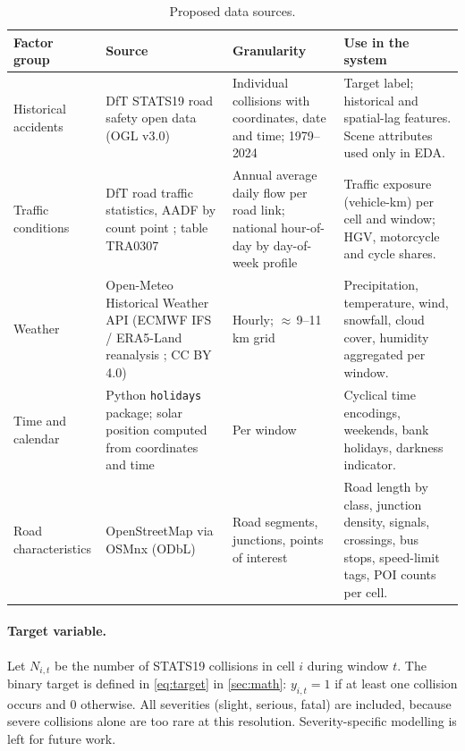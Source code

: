 \begin{table}[t]
\centering
\caption{Proposed data sources.}
\label{tab:datasources}
\footnotesize
\begin{tabularx}{\textwidth}{L{2.4cm} L{3.4cm} L{3.1cm} Y}
\toprule
\textbf{Factor group} & \textbf{Source} & \textbf{Granularity} & \textbf{Use in the system} \\
\midrule
Historical accidents & DfT STATS19 road safety open data \cite{dft2025roadsafetydata} (OGL v3.0) & Individual collisions with coordinates, date and time; 1979--2024 & Target label; historical and spatial-lag features. Scene attributes used only in EDA. \\
Traffic conditions & DfT road traffic statistics, AADF by count point \cite{dft2025trafficcounts}; table TRA0307 \cite{dft2025tra0307} & Annual average daily flow per road link; national hour-of-day by day-of-week profile & Traffic exposure (vehicle-km) per cell and window; HGV, motorcycle and cycle shares. \\
Weather & Open-Meteo Historical Weather API \cite{openmeteo} (ECMWF IFS / ERA5-Land reanalysis \cite{hersbach2020era5}; CC BY 4.0) & Hourly; $\approx$\,9--11\,km grid & Precipitation, temperature, wind, snowfall, cloud cover, humidity aggregated per window. \\
Time and calendar & Python \texttt{holidays} package; solar position computed from coordinates and time & Per window & Cyclical time encodings, weekends, bank holidays, darkness indicator. \\
Road characteristics & OpenStreetMap \cite{osm} via OSMnx \cite{boeing2017osmnx} (ODbL) & Road segments, junctions, points of interest & Road length by class, junction density, signals, crossings, bus stops, speed-limit tags, POI counts per cell. \\
\bottomrule
\end{tabularx}
\end{table}

\paragraph{Target variable.}
Let $N_{i,t}$ be the number of STATS19 collisions in cell $i$ during window $t$. The binary target is defined in \cref{eq:target} in \cref{sec:math}: $y_{i,t}=1$ if at least one collision occurs and $0$ otherwise. All severities (slight, serious, fatal) are included, because severe collisions alone are too rare at this resolution. Severity-specific modelling is left for future work.

